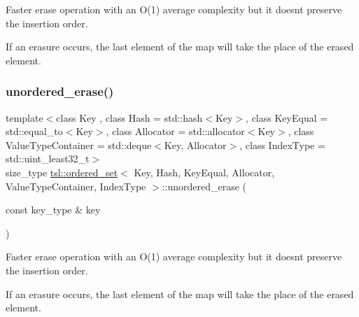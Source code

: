 Faster erase operation with an O(1) average complexity but it doesn\textquotesingle{}t preserve the insertion order.

If an erasure occurs, the last element of the map will take the place of the erased element. \mbox{\label{classtsl_1_1ordered__set_ae89a8c07da6b74f3dd737a77366d49cf}} 
\subsubsection{\texorpdfstring{unordered\_erase()}{unordered\_erase()}\hspace{0.1cm}{\footnotesize\ttfamily [3/6]}}
{\footnotesize\ttfamily template$<$class Key , class Hash  = std\+::hash$<$\+Key$>$, class Key\+Equal  = std\+::equal\+\_\+to$<$\+Key$>$, class Allocator  = std\+::allocator$<$\+Key$>$, class Value\+Type\+Container  = std\+::deque$<$\+Key, Allocator$>$, class Index\+Type  = std\+::uint\+\_\+least32\+\_\+t$>$ \\
size\+\_\+type \mbox{\hyperlink{classtsl_1_1ordered__set}{tsl\+::ordered\+\_\+set}}$<$ Key, Hash, Key\+Equal, Allocator, Value\+Type\+Container, Index\+Type $>$\+::unordered\+\_\+erase (\begin{DoxyParamCaption}\item[{const key\+\_\+type \&}]{key }\end{DoxyParamCaption})\hspace{0.3cm}{\ttfamily [inline]}}





Faster erase operation with an O(1) average complexity but it doesn\textquotesingle{}t preserve the insertion order.

If an erasure occurs, the last element of the map will take the place of the erased element. \mbox{\label{classtsl_1_1ordered__set_a9b291ce4c12967996a10646ded0d352c}} 
